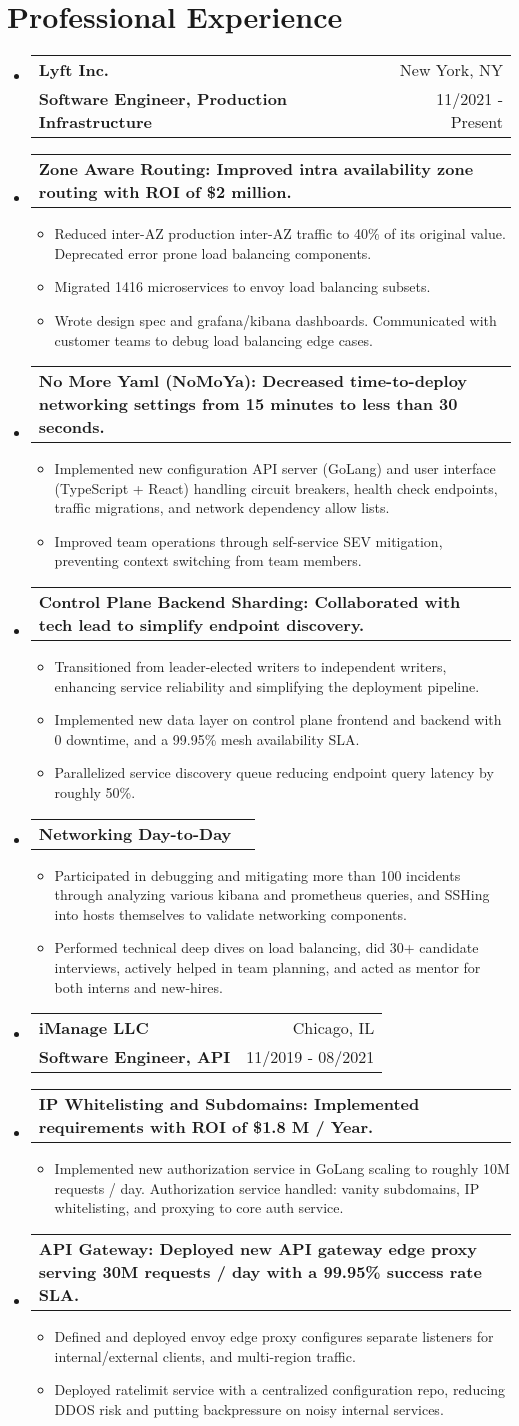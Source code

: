\documentclass[letterpaper,11pt]{article}
\makeatletter
\newcommand{\cvitem}[1]{
  \item\small{
    {#1\vspace{-2pt}}
  }
}
\newcommand{\cvproject}[2]{
  \vspace{-4pt}\item
    \begin{tabular*}{\textwidth}[t]{l@{\extracolsep{\fill}}r}
      \textbf{\small#1} & \small #2 \\
    \end{tabular*}\vspace{-9pt}
}
\newcommand{\cvheading}[4]{
  \vspace{-2pt}\item
    \begin{tabular*}{\textwidth}[t]{l@{\extracolsep{\fill}}r}
      \textbf{#1} & #2 \\
      \small#3 & \small #4 \\
    \end{tabular*}\vspace{-9pt}
}
\newcommand{\cvheadingstart}{\begin{itemize}[leftmargin=0in, label={}]}
\newcommand{\cvheadingend}{\end{itemize}}
\newcommand{\cvitemstart}{\begin{itemize}\justifying}
\newcommand{\cvitemend}{\end{itemize}\vspace{-5pt}}
\makeatother
\begin{document}
\section{Professional Experience}
\cvheadingstart
  \cvheading
    {Lyft Inc.}{New York, NY}
    {\textbf{Software Engineer, Production Infrastructure}}{11/2021 - Present}
    \cvproject{Zone Aware Routing: Improved intra availability zone routing with ROI of \$2 million.}{}
    \cvitemstart
      \cvitem{Reduced inter-AZ production inter-AZ traffic to 40\% of its original value. Deprecated error prone load balancing components.}
      \cvitem{Migrated 1416 microservices to envoy load balancing subsets.}
      \cvitem{Wrote design spec and grafana/kibana dashboards. Communicated with customer teams to debug load balancing edge cases.}
    \cvitemend
    \cvproject{No More Yaml (NoMoYa): Decreased time-to-deploy networking settings from 15 minutes to less than 30 seconds.}{}
    \cvitemstart
      \cvitem{Implemented new configuration API server (GoLang) and user interface (TypeScript + React) handling circuit breakers, health check endpoints, traffic migrations, and network dependency allow lists.}
      \cvitem{Improved team operations through self-service SEV mitigation, preventing context switching from team members.}
    \cvitemend
    \cvproject{Control Plane Backend Sharding: Collaborated with tech lead to simplify endpoint discovery.}{}
    \cvitemstart
      \cvitem{Transitioned from leader-elected writers to independent writers, enhancing service reliability and simplifying the deployment pipeline.}
      \cvitem{Implemented new data layer on control plane frontend and backend with 0 downtime, and a 99.95\% mesh availability SLA.}
      \cvitem{Parallelized service discovery queue reducing endpoint query latency by roughly 50\%.}
    \cvitemend
    \cvproject{Networking Day-to-Day}{}
    \cvitemstart
      \cvitem{Participated in debugging and mitigating more than 100 incidents through analyzing various kibana and prometheus queries, and SSHing into hosts themselves to validate networking components.}
      \cvitem{Performed technical deep dives on load balancing, did 30+ candidate interviews, actively helped in team planning, and acted as mentor for both interns and new-hires.}
    \cvitemend
  \cvheading
    {iManage LLC}{Chicago, IL}
    {\textbf{Software Engineer, API}}{11/2019 - 08/2021}
    \cvproject{IP Whitelisting and Subdomains: Implemented requirements with ROI of \$1.8 M / Year.}{}
    \cvitemstart
      \cvitem{Implemented new authorization service in GoLang scaling to roughly 10M requests / day. Authorization service handled: vanity subdomains, IP whitelisting, and proxying to core auth service.}
    \cvitemend
    \cvproject{API Gateway: Deployed new API gateway edge proxy serving 30M requests / day with a 99.95\% success rate SLA.}{}
    \cvitemstart
      \cvitem{Defined and deployed envoy edge proxy configures separate listeners for internal/external clients, and multi-region traffic.}
      \cvitem{Deployed ratelimit service with a centralized configuration repo, reducing DDOS risk and putting backpressure on noisy internal services.}
    \cvitemend
\cvheadingend
\end{document}
